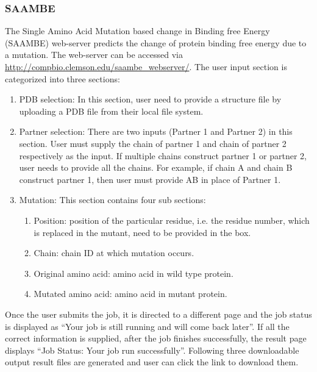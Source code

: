 \documentclass[9pt,tutorial]{livecoms}
\begin{document}
\subsubsection{SAAMBE}
The Single Amino Acid Mutation based change in Binding free Energy (SAAMBE)\cite{petukh2015predicting} web-server predicts the change of protein binding free energy due to a mutation. The web-server\cite{petukh2015predicting,petukh2016saambe} can be accessed via \url{http://compbio.clemson.edu/saambe_webserver/}. 
The user input section is categorized into three sections:
\begin{enumerate}
    \item PDB selection: In this section, user need to provide a structure file by uploading a PDB file from their local file system.
    
    \item Partner selection: There are two inputs (Partner 1 and Partner 2) in this section. User must supply the chain of partner 1 and chain of partner 2 respectively as the input. If multiple chains construct partner 1 or partner 2, user needs to provide all the chains. For example, if chain A and chain B construct partner 1, then user must provide AB in place of Partner 1.
    
    \item Mutation: This section contains four sub sections:
    \begin{enumerate}
	    \item Position: position of the particular residue, i.e. the residue number, which is replaced in the mutant, need to be provided in the box.
	    
	    \item Chain: chain ID at which mutation occurs.
	    
	    \item Original amino acid: amino acid in wild type protein.
	    
	    \item Mutated amino acid: amino acid in mutant protein.
    \end{enumerate}
\end{enumerate}
Once the user submits the job, it is directed to a different page and the job status is displayed as ``Your job is still running and will come back later''. If all the correct information is supplied, after the job finishes successfully, the result page displays “Job Status: Your job run successfully”. Following three downloadable output result files are generated and user can click the link to download them.
\end{document}
